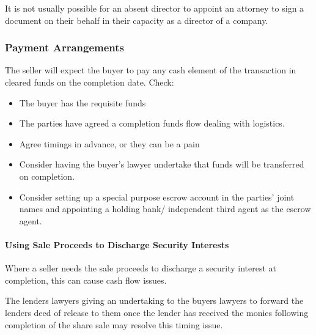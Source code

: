\documentclass[
]{article}
\newenvironment{Shaded}{}{}
\newcommand{\NormalTok}[1]{#1}
\providecommand{\tightlist}{%
  \setlength{\itemsep}{0pt}\setlength{\parskip}{0pt}}
\begin{document}
\begin{Shaded}
\begin{Highlighting}[]
\NormalTok{It is not usually possible for an absent director to appoint an attorney to sign a document on their behalf in their capacity as a director of a company.}
\end{Highlighting}
\end{Shaded}

\hypertarget{payment-arrangements}{%
\subsubsection{Payment Arrangements}\label{payment-arrangements}}

The seller will expect the buyer to pay any cash element of the
transaction in cleared funds on the completion date. Check:

\begin{itemize}
\tightlist
\item
  The buyer has the requisite funds
\item
  The parties have agreed a completion funds flow dealing with
  logistics.
\item
  Agree timings in advance, or they can be a pain
\item
  Consider having the buyer's lawyer undertake that funds will be
  transferred on completion.
\item
  Consider setting up a special purpose escrow account in the parties'
  joint names and appointing a holding bank/ independent third agent as
  the escrow agent.
\end{itemize}

\hypertarget{using-sale-proceeds-to-discharge-security-interests}{%
\paragraph{Using Sale Proceeds to Discharge Security
Interests}\label{using-sale-proceeds-to-discharge-security-interests}}

Where a seller needs the sale proceeds to discharge a security interest
at completion, this can cause cash flow issues.

\begin{Shaded}
\begin{Highlighting}[]
\NormalTok{The lender\textquotesingle{}s lawyers giving an undertaking to the buyer\textquotesingle{}s lawyers to forward the lender\textquotesingle{}s deed of release to them once the lender has received the monies following completion of the share sale may resolve this timing issue.}
\end{Highlighting}
\end{Shaded}
\end{document}
